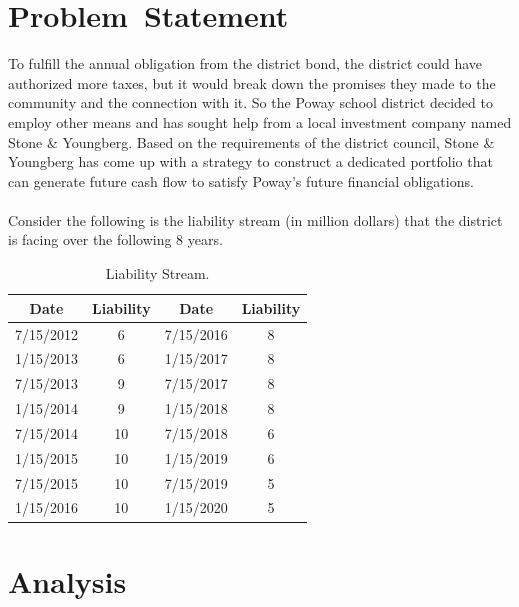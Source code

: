 \documentclass[oneside,12pt]{report}
\begin{document}
\chapter{Problem~Statement}\label{}
%
To fulfill the annual obligation from the district bond, the district could have authorized more taxes, but it would break down the promises they made to the community and the connection with it. So the Poway school district decided to employ other means and has sought help from a local investment company named Stone \& Youngberg.  Based on the requirements of the district  council, Stone \& Youngberg has come up with a strategy to construct a dedicated portfolio that can generate future cash flow to satisfy Poway's future financial obligations. \\
\\
Consider the following is the liability stream (in million dollars) that the district is facing over the following 8 years.
\begin{table}[h]
\centering  
\begin{tabular}{cccc}
\hline
Date  &Liability  &Date  &Liability\\ \hline  
7/15/2012  &6  &7/15/2016  &8\\
1/15/2013  &6  &1/15/2017  &8\\ 
7/15/2013  &9  &7/15/2017  &8\\ 
1/15/2014  &9  &1/15/2018  &8\\ 
7/15/2014  &10 &7/15/2018  &6\\ 
1/15/2015  &10  &1/15/2019  &6\\ 
7/15/2015  &10  &7/15/2019  &5 \\ 
1/15/2016  &10  &1/15/2020  &5\\ \hline
\end{tabular}
\caption{Liability Stream.}
\end{table}

\chapter{Analysis}\label{}
%
\end{document}
